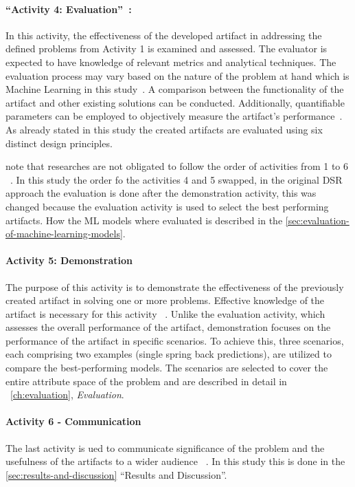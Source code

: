 \paragraph{``Activity 4: Evaluation''~\cite[p. 56]{peffers2007design}:}
In this activity, the effectiveness of the developed artifact in addressing the defined problems from Activity 1 is
examined and assessed.
The evaluator is expected to have knowledge of relevant metrics and analytical techniques.
The evaluation process may vary based on the nature of the problem at hand which is Machine Learning in this
study~\cite[p. 56]{peffers2007design}.
A comparison between the functionality of the artifact and other existing solutions can be conducted.
Additionally, quantifiable parameters can be employed to objectively measure the artifact's
performance~\cite[p. 56]{peffers2007design}.
As already stated in this study the created artifacts are evaluated using six distinct design principles.

\cite{peffers2007design} note that researches are not obligated to follow the order of activities
from 1 to 6
~\cite[p. 56]{peffers2007design}.
In this study the order fo the activities 4 and 5 swapped, in the original DSR approach the evaluation is done after
the demonstration activity, this was changed because the evaluation activity is used to select the best performing
artifacts.
How the \ac{ML} models where evaluated is described in the \cref{sec:evaluation-of-machine-learning-models}.


\paragraph{Activity 5: Demonstration}
The purpose of this activity is to demonstrate the effectiveness of the previously created artifact in solving one or
more problems.
Effective knowledge of the artifact is necessary for this activity
~\cite[p. 55]{peffers2007design}.
Unlike the evaluation activity, which assesses the overall performance of the artifact, demonstration focuses on the
performance of the artifact in specific scenarios.
To achieve this, three scenarios, each comprising two examples (single spring back predictions), are utilized to
compare the best-performing models.
The scenarios are selected to cover the entire attribute space of the problem and are described in detail in
~\cref{ch:evaluation}, \textit{Evaluation}.

\paragraph{Activity 6 - Communication}
The last activity is ued to communicate significance of the problem and the usefulness of the artifacts to a wider
audience
~\cite[p. 56]{peffers2007design}.
In this study this is done in the \cref{sec:results-and-discussion} ``Results and Discussion''.



